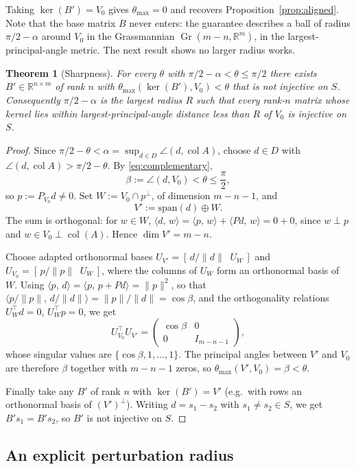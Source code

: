 \documentclass[11pt]{article}
\numberwithin{equation}{section}
\newtheorem{theorem}{Theorem}[section]
\theoremstyle{remark}
\newcommand{\R}{\mathbb{R}}
\DeclareMathOperator{\col}{col}
\DeclareMathOperator{\Gr}{Gr}
\newcommand{\norm}[1]{\lVert #1\rVert}
\newcommand{\ip}[2]{\langle #1,\,#2\rangle}
\begin{document}
Taking $\ker(B')=V_0$ gives $\theta_{\max}=0$ and recovers Proposition~\ref{prop:aligned}. Note that the base matrix $B$ never enters: the guarantee describes a ball of radius $\pi/2-\alpha$ around $V_0$ in the Grassmannian $\Gr(m-n,\R^m)$, in the largest-principal-angle metric. The next result shows no larger radius works.

\begin{theorem}[Sharpness]\label{thm:sharp}
For every $\theta$ with $\pi/2-\alpha<\theta\le\pi/2$ there exists $B'\in\R^{n\times m}$ of rank $n$ with $\theta_{\max}(\ker(B'),V_0)<\theta$ that is \emph{not} injective on $S$. Consequently $\pi/2-\alpha$ is the largest radius $R$ such that every rank-$n$ matrix whose kernel lies within largest-principal-angle distance less than $R$ of $V_0$ is injective on $S$.
\end{theorem}

\begin{proof}
Since $\pi/2-\theta<\alpha=\sup_{d\in D}\angle(d,\col A)$, choose $d\in D$ with $\angle(d,\col A)>\pi/2-\theta$. By \eqref{eq:complementary},
\[
\beta:=\angle(d,V_0)<\theta\le\frac{\pi}{2},
\]
so $p:=P_{V_0}d\ne 0$. Set $W:=V_0\cap p^{\perp}$, of dimension $m-n-1$, and
\[
V':=\mathrm{span}(d)\oplus W .
\]
The sum is orthogonal: for $w\in W$, $\ip{d}{w}=\ip{p}{w}+\ip{Pd}{w}=0+0$, since $w\perp p$ and $w\in V_0\perp\col(A)$. Hence $\dim V'=m-n$.

Choose adapted orthonormal bases $U_{V'}=[\,d/\norm{d}\;\; U_W\,]$ and $U_{V_0}=[\,p/\norm{p}\;\; U_W\,]$, where the columns of $U_W$ form an orthonormal basis of $W$. Using $\ip{p}{d}=\ip{p}{p+Pd}=\norm{p}^2$, so that $\bigl\langle p/\norm{p},\,d/\norm{d}\bigr\rangle=\norm{p}/\norm{d}=\cos\beta$, and the orthogonality relations $U_W^{\top}d=0$, $U_W^{\top}p=0$, we get
\[
U_{V_0}^{\top}U_{V'}=\begin{pmatrix}\cos\beta & 0\\ 0 & I_{m-n-1}\end{pmatrix},
\]
whose singular values are $\{\cos\beta,1,\dots,1\}$. The principal angles between $V'$ and $V_0$ are therefore $\beta$ together with $m-n-1$ zeros, so $\theta_{\max}(V',V_0)=\beta<\theta$.

Finally take any $B'$ of rank $n$ with $\ker(B')=V'$ (e.g.\ with rows an orthonormal basis of $(V')^{\perp}$). Writing $d=s_1-s_2$ with $s_1\ne s_2\in S$, we get $B's_1=B's_2$, so $B'$ is not injective on $S$.
\end{proof}

\subsection{An explicit perturbation radius}
\end{document}
